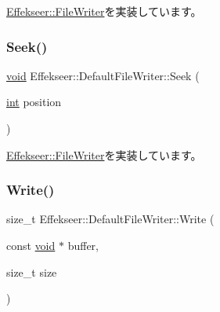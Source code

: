 \mbox{\hyperlink{class_effekseer_1_1_file_writer_a656bbee191e65ccc63791d5c41c6e853}{Effekseer\+::\+File\+Writer}}を実装しています。

\mbox{\label{class_effekseer_1_1_default_file_writer_a2329533000c58267e8e2457f3480bf73}} 
\subsubsection{\texorpdfstring{Seek()}{Seek()}}
{\footnotesize\ttfamily \mbox{\hyperlink{namespace_effekseer_ab34c4088e512200cf4c2716f168deb56}{void}} Effekseer\+::\+Default\+File\+Writer\+::\+Seek (\begin{DoxyParamCaption}\item[{\mbox{\hyperlink{namespace_effekseer_ace0abf7c2e6947e519ebe8b54cbcc30a}{int}}}]{position }\end{DoxyParamCaption})\hspace{0.3cm}{\ttfamily [virtual]}}



\mbox{\hyperlink{class_effekseer_1_1_file_writer_a9057c57df33d5112bc0d2c4e3e0c542d}{Effekseer\+::\+File\+Writer}}を実装しています。

\mbox{\label{class_effekseer_1_1_default_file_writer_afceaff03cd45477058ffdc1370d06884}} 
\subsubsection{\texorpdfstring{Write()}{Write()}}
{\footnotesize\ttfamily size\+\_\+t Effekseer\+::\+Default\+File\+Writer\+::\+Write (\begin{DoxyParamCaption}\item[{const \mbox{\hyperlink{namespace_effekseer_ab34c4088e512200cf4c2716f168deb56}{void}} $\ast$}]{buffer,  }\item[{size\+\_\+t}]{size }\end{DoxyParamCaption})\hspace{0.3cm}{\ttfamily [virtual]}}



